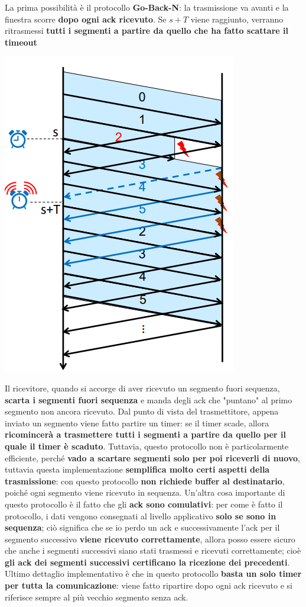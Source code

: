 \documentclass[12pt]{article}
\begin{document}
La prima possibilità è il protocollo \textbf{Go-Back-N}: la trasmissione va avanti e la finestra scorre \textbf{dopo ogni ack ricevuto}.
Se $s+T$ viene raggiunto, verranno ritrasmessi \textbf{tutti i segmenti a partire da quello che ha fatto scattare il timeout}
\begin{center}
    \includegraphics[width = 0.40\linewidth]{Images/54.png}
\end{center}
Il ricevitore, quando si accorge di aver ricevuto un segmento fuori sequenza, \textbf{scarta i segmenti fuori sequenza} e manda degli ack che "puntano" al primo segmento non ancora
ricevuto. Dal punto di vista del trasmettitore, appena inviato un segmento viene fatto partire un timer: se il timer scade, allora \textbf{ricomincerà a trasmettere tutti i segmenti a partire da quello per il quale il timer è scaduto}.
Tuttavia, questo protocollo non è particolarmente efficiente, perché \textbf{vado a scartare segmenti solo per poi riceverli di nuovo}, tuttavia questa implementazione \textbf{semplifica molto certi aspetti della trasmissione}: con questo protocollo
\textbf{non richiede buffer al destinatario}, poiché ogni segmento viene ricevuto in sequenza. Un'altra cosa importante di questo protocollo è il fatto che gli \textbf{ack sono comulativi}: per come è fatto il protocollo, i dati vengono
consegnati al livello applicativo \textbf{solo se sono in sequenza}; ciò significa che se io perdo un ack e successivamente l'ack per il segmento successivo \textbf{viene ricevuto correttamente}, allora posso essere sicuro che anche i segmenti successivi
siano stati trasmessi e ricevuti correttamente; cioè \textbf{gli ack dei segmenti successivi certificano la ricezione dei precedenti}. Ultimo dettaglio implementativo è che in questo protocollo \textbf{basta un solo timer per tutta la comunicazione}: viene fatto
ripartire dopo ogni ack ricevuto e si riferisce sempre al più vecchio segmento senza ack. \newline
\end{document}
